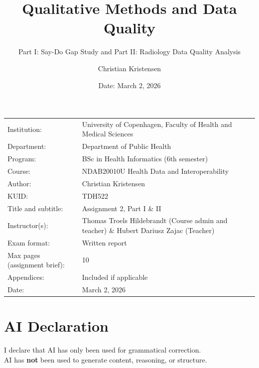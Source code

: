 \documentclass[12pt]{article}
\author{Christian Kristensen}
\title{Qualitative Methods and Data Quality}
\subtitle{Part I: Say-Do Gap Study and Part II: Radiology Data Quality Analysis}
\date{Date: March 2, 2026}
\begin{document}
\maketitle

\onehalfspacing

\begin{table}[h]
\def\arraystretch{1.5}
\begin{tabularx}{\textwidth}{l X}
Institution: & University of Copenhagen, Faculty of Health and Medical Sciences \\
Department: & Department of Public Health \\
Program: & BSc in Health Informatics (6th semester) \\
Course: & NDAB20010U Health Data and Interoperability \\
Author: & Christian Kristensen \\
KUID: & TDH522 \\
Title and subtitle: & Assignment 2, Part I \& II \\
Instructor(s): & Thomas Troels Hildebrandt (Course admin and teacher) \& Hubert Dariusz Zajac (Teacher) \\
Exam format: & Written report \\
Max pages (assignment brief): & 10 \\
Appendices: & Included if applicable \\
Date: & March 2, 2026
\end{tabularx}
\end{table}

\section*{AI Declaration}
I declare that AI has only been used for grammatical correction.\\
AI has \textbf{not} been used to generate content, reasoning, or structure.
\newpage

\tableofcontents
\clearpage


\clearpage


\clearpage


\clearpage
\appendix


\clearpage
\printbibliography[heading=bibintoc,title={References}]
\end{document}

